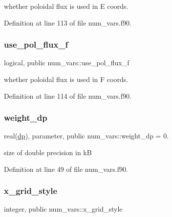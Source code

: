 whether poloidal flux is used in E coords. 



Definition at line 113 of file num\+\_\+vars.\+f90.

\mbox{\label{namespacenum__vars_ae21ec57b791e369c3558c0eb3da1555b}} 
\subsubsection{\texorpdfstring{use\+\_\+pol\+\_\+flux\+\_\+f}{use\_pol\_flux\_f}}
{\footnotesize\ttfamily logical, public num\+\_\+vars\+::use\+\_\+pol\+\_\+flux\+\_\+f}



whether poloidal flux is used in F coords. 



Definition at line 114 of file num\+\_\+vars.\+f90.

\mbox{\label{namespacenum__vars_ad5be06791ebf0ca75fc6dc7339916ae8}} 
\subsubsection{\texorpdfstring{weight\+\_\+dp}{weight\_dp}}
{\footnotesize\ttfamily real(\hyperlink{namespacenum__vars_a03802aa2bd86439d7a9370836fabf3f2}{dp}), parameter, public num\+\_\+vars\+::weight\+\_\+dp = 0.}



size of double precision in kB 



Definition at line 49 of file num\+\_\+vars.\+f90.

\mbox{\label{namespacenum__vars_a72c4ea80e13135b4c314f3f9d3bfdc81}} 
\subsubsection{\texorpdfstring{x\+\_\+grid\+\_\+style}{x\_grid\_style}}
{\footnotesize\ttfamily integer, public num\+\_\+vars\+::x\+\_\+grid\+\_\+style}



